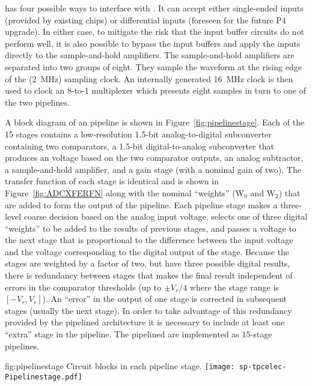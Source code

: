  has four possible ways to interface with .  It
can accept either single-ended inputs (provided by existing 
chips) or differential inputs (foreseen for the future  P4 upgrade).
In either case, to mitigate the risk that the input buffer circuits do not perform
well, it is also possible to bypass the input buffers and apply the inputs directly
to the sample-and-hold amplifiers.  The sample-and-hold amplifiers are separated
into two groups of eight.  They sample the waveform at the rising edge of the
(\SI{2}{MHz}) sampling clock.  An internally generated \SI{16}{MHz} clock is then
used to clock an \num{8}-to-\num{1} multiplexer which presents eight samples in 
turn to one of the two  pipelines.

A block diagram of an  pipeline is shown in
Figure~\ref{fig:pipelinestage}. Each of the \num{15} stages contains a low-resolution
\num{1.5}-bit analog-to-digital subconverter containing two comparators, a
\num{1.5}-bit digital-to-analog subconverter that produces an voltage based on
the two comparator outputs, an analog subtractor, a sample-and-hold amplifier,
and a gain stage (with a nominal gain of two). The transfer function of
each stage is identical and is shown in Figure~\ref{fig:ADCXFERFN} along with
the nominal ``weights'' (W$_0$ and W$_2$) that are added to form the output of the
pipeline. Each pipeline stage makes a three-level coarse decision based on the
analog input voltage, selects one of three digital ``weights'' to be added to the
results of previous stages, and passes a voltage to the next stage that is
proportional to the difference between the input voltage and the voltage
corresponding to the digital output of the stage.  Because the stages are
weighted by a factor of two, but have three possible digital results, there is
redundancy between stages that makes the final result independent of errors in
the comparator thresholds (up to $\pm V_r/4$ where the stage range is
$[-V_r,V_r]$).  An ``error'' in the output of one stage is corrected in subsequent
stages (usually the next stage).  In order to take advantage of this redundancy
provided by the pipelined architecture it is necessary to include at least one
``extra'' stage in the pipeline.  The  pipelined  are
implemented as \num{15}-stage pipelines.

\begin{dunefigure}
{fig:pipelinestage}
{Circuit blocks in each  pipeline stage.}
\texttt{[image: sp-tpcelec-Pipelinestage.pdf]}
\end{dunefigure}


